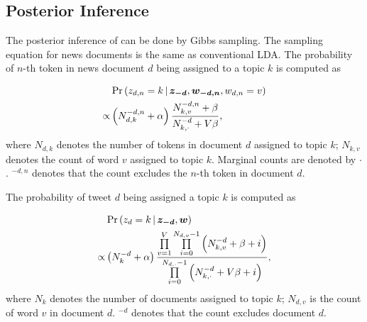 \subsection{Posterior Inference}
The posterior inference of \stlda can be done by Gibbs sampling. The sampling equation for news documents is the same as conventional LDA. The probability of $n$-th token in news document $d$ being assigned to a topic $k$ is computed as

\begin{align}
&\Pr \left( z_{d,n}=k \,|\, \bm{z_{-d}},\bm{w_{-d,n}},w_{d,n}=v \right) \notag\\
\propto &\left( N_{d,k}^{-d,n} + \alpha \right) \frac {N_{k,v}^{-d,n} + \beta } {N_{k,\cdot}^{-d} + V\beta},
\end{align}
where $N_{d,k}$ denotes the number of tokens in document $d$ assigned to topic $k$; $N_{k,v}$ denotes the count of word $v$ assigned to topic $k$. Marginal counts are denoted by $\cdot$. $^{-d,n}$ denotes that the count excludes the $n$-th token in document $d$.

The probability of tweet $d$ being assigned a topic $k$ is computed as

\begin{align}
&\Pr \left( z_d=k \,|\, \bm{z_{-d}},\bm{w} \right) \notag\\
\propto &\left( N_k^{-d} + \alpha \right) \frac {\prod\limits_{v=1}^{V} \prod\limits_{i=0}^{N_{d,v}-1} \left( N_{k,v}^{-d} + \beta + i \right)} {\prod\limits_{i=0}^{N_{d,\cdot}-1} \left( N_{k,\cdot}^{-d} + V\beta + i \right)},
\end{align}
where $N_k$ denotes the number of documents assigned to topic $k$; $N_{d,v}$ is the count of word $v$ in document $d$. $^{-d}$ denotes that the count excludes document $d$.




